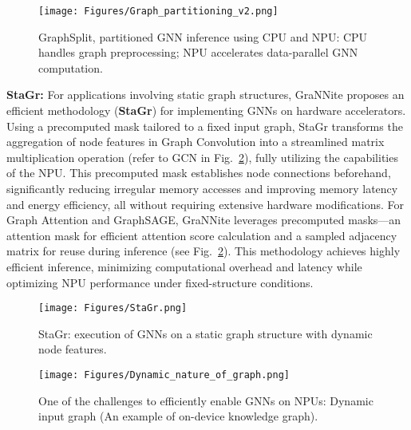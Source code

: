 \begin{figure}[t!]
\begin{center}
\texttt{[image: Figures/Graph\_partitioning\_v2.png]}%
\end{center}
\caption{GraphSplit, partitioned GNN inference using CPU and NPU: CPU handles graph preprocessing; NPU accelerates data-parallel GNN computation.}\label{fig:GraphSplit}
\end{figure}

\textbf{StaGr:} For applications involving static graph structures,
GraNNite proposes an efficient methodology (\textbf{StaGr}) for implementing GNNs on hardware accelerators. Using a precomputed mask tailored to a fixed input graph, StaGr transforms the aggregation of node features in Graph Convolution into a streamlined matrix multiplication operation (refer to GCN in Fig.~\ref{fig:StaGr}), fully utilizing the capabilities of the NPU.
This precomputed mask establishes node connections beforehand, significantly reducing irregular memory accesses and improving memory latency and energy efficiency, all without requiring extensive hardware modifications. For Graph Attention and GraphSAGE, GraNNite leverages precomputed masks—an attention mask for efficient attention score calculation and a sampled adjacency matrix for reuse during inference (see Fig.~\ref{fig:StaGr}).
This methodology achieves highly efficient inference, minimizing computational overhead and latency while optimizing NPU performance under fixed-structure conditions.

\begin{figure}[t!]
\begin{center}
\texttt{[image: Figures/StaGr.png]}%
\end{center}
\caption{StaGr: execution of GNNs on a static graph structure with dynamic node features.}\label{fig:StaGr}
\end{figure}

\begin{figure}[t!]
\begin{center}
\texttt{[image: Figures/Dynamic\_nature\_of\_graph.png]}%
\end{center}
\caption{One of the challenges to efficiently enable GNNs on NPUs: Dynamic input graph (An example of on-device knowledge graph).}\label{fig:dyn_graph}
\end{figure}


